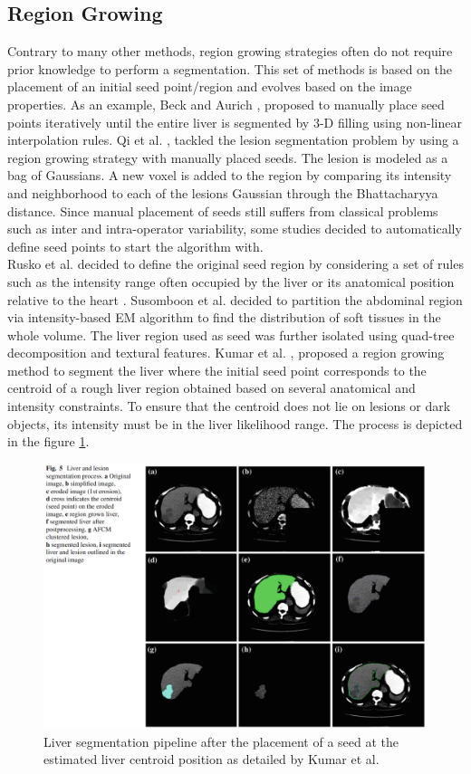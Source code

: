 \documentclass[]{article}
\begin{document}
	\subsection*{Region Growing}
	
	Contrary to many other methods, region growing strategies often do not
	require prior knowledge to perform a segmentation. This set of methods
	is based on the placement of an initial seed point/region and evolves
	based on the image properties. As an example, Beck and Aurich \cite{Beck2007}, proposed to manually place seed points iteratively
	until the entire liver is segmented by 3-D filling using non-linear
	interpolation rules.
	Qi et al. \cite{Qi2008}, tackled the lesion segmentation problem by using a region
	growing strategy with manually placed seeds. The lesion is modeled as a
	bag of Gaussians. A new voxel is added to the region by comparing its
	intensity and neighborhood to each of the lesions Gaussian through the
	Bhattacharyya distance.
	Since manual placement of seeds still suffers from classical problems
	such as inter and intra-operator variability, some studies decided to
	automatically define seed points to start the algorithm with.\\
	Rusko et al. 
	decided to define the original seed region by considering a set of rules
	such as the intensity range often occupied by the liver or its
	anatomical position relative to the heart \cite{Rusko2007, Rusko2009}.
	Susomboon et al. \cite{Susomboon2007} decided to partition the abdominal region via intensity-based
	EM algorithm to find the distribution of soft tissues in the whole
	volume. The liver region used as seed was further isolated using
	quad-tree decomposition and textural features.
	Kumar et al. \cite{Kumar2013}, proposed a region growing method to segment the liver where the
	initial seed point corresponds to the centroid of a rough liver region
	obtained based on several anatomical and intensity constraints. To
	ensure that the centroid does not lie on lesions or dark objects, its
	intensity must be in the liver likelihood range. The process is depicted
	in the figure \ref{Kumar2013_Fig5}.
	
	\begin{figure}[ht!]
		\centering
		\includegraphics[width=0.7\linewidth]{images/image19}
		\caption{Liver segmentation pipeline after the placement of a seed at the estimated liver centroid position as detailed by Kumar et al. \cite{Kumar2013}}
		\label{Kumar2013_Fig5}
	\end{figure}
	
\end{document}
